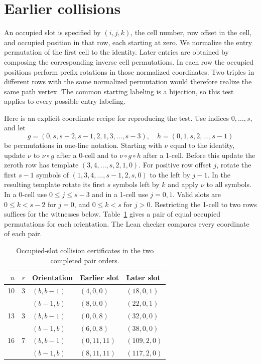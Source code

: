 \documentclass[11pt]{article}
\begin{document}
\section{Earlier collisions}\label{sec:slots}
An occupied slot is specified by $(i,j,k)$, the cell number, row offset
in the cell, and occupied position in that row, each starting at zero.
We normalize the entry permutation of the first cell to the identity.
Later entries are obtained by composing the corresponding inverse cell
permutations. In each row the occupied positions perform prefix rotations
in those normalized coordinates. Two triples in different rows with the
same normalized permutation would therefore realize the same path vertex.
The common starting labeling is a bijection, so this test applies to every
possible entry labeling.

Here is an explicit coordinate recipe for reproducing the test. Use
indices $0,\ldots,s$, and let
\[
 g=(0,s,s-2,s-1,2,1,3,\ldots,s-3),\quad
 h=(0,1,s,2,\ldots,s-1)
\]
be permutations in one-line notation. Starting with $\nu$ equal to the
identity, update $\nu$ to $\nu\circ g$ after a 0-cell and to
$\nu\circ g\circ h$ after a 1-cell. Before this update the zeroth row has
template $(3,4,\ldots,s,2,1,0)$. For positive row offset $j$, rotate the
first $s-1$ symbols of $(1,3,4,\ldots,s-1,2,s,0)$ to the left by $j-1$.
In the resulting template rotate its first $s$ symbols left by $k$ and apply
$\nu$ to all symbols. In a 0-cell use $0\le j\le s-3$ and in a 1-cell
use $j=0,1$. Valid slots are $0\le k<s-2$ for $j=0$, and
$0\le k<s$ for $j>0$. Restricting the 1-cell to two rows suffices for
the witnesses below. Table~\ref{tab:witnesses} gives a pair of equal
occupied permutations for each orientation. The Lean checker compares
every coordinate of each pair.
\begin{table}[ht]
\centering
\begin{tabular}{@{}rrlll@{}}\toprule
$n$ & $r$ & Orientation & Earlier slot & Later slot\\\midrule
10&3&$(b,b-1)$&$(4,0,0)$&$(18,0,1)$\\
  & &$(b-1,b)$&$(8,0,0)$&$(22,0,1)$\\
13&3&$(b,b-1)$&$(0,0,8)$&$(32,0,0)$\\
  & &$(b-1,b)$&$(6,0,8)$&$(38,0,0)$\\
16&7&$(b,b-1)$&$(0,11,11)$&$(109,2,0)$\\
  & &$(b-1,b)$&$(8,11,11)$&$(117,2,0)$\\\bottomrule
\end{tabular}
\caption{Occupied-slot collision certificates in the two completed pair orders.}
\label{tab:witnesses}
\end{table}
\end{document}
